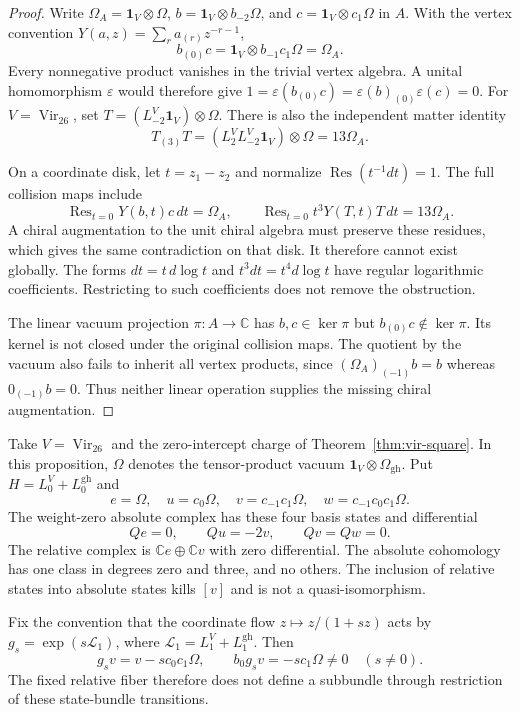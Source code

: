 \begin{proof}
Write $\Omega_A=\mathbf1_V\otimes\Omega$, $b=\mathbf1_V\otimes b_{-2}\Omega$, and $c=\mathbf1_V\otimes c_1\Omega$ in $A$.
With the vertex convention $Y(a,z)=\sum_r a_{(r)}z^{-r-1}$,
\[
 b_{(0)}c=\mathbf1_V\otimes b_{-1}c_1\Omega=\Omega_A.
\]
Every nonnegative product vanishes in the trivial vertex algebra.
A unital homomorphism $\varepsilon$ would therefore give
$1=\varepsilon(b_{(0)}c)=\varepsilon(b)_{(0)}\varepsilon(c)=0$.
For $V=\operatorname{Vir}_{26}$, set $T=(L_{-2}^V\mathbf1_V)\otimes\Omega$.
There is also the independent matter identity
\[
 T_{(3)}T=(L_2^VL_{-2}^V\mathbf1_V)\otimes\Omega=13\Omega_A.
\]

On a coordinate disk, let $t=z_1-z_2$ and normalize
$\operatorname{Res}(t^{-1}dt)=1$.
The full collision maps include
\[
 \operatorname{Res}_{t=0}Y(b,t)c\,dt=\Omega_A,
 \qquad
 \operatorname{Res}_{t=0}t^3Y(T,t)T\,dt=13\Omega_A.
\]
A chiral augmentation to the unit chiral algebra must preserve these residues, which gives the same contradiction on that disk.
It therefore cannot exist globally.
The forms $dt=t\,d\log t$ and $t^3dt=t^4d\log t$ have regular logarithmic coefficients.
Restricting to such coefficients does not remove the obstruction.

The linear vacuum projection $\pi:A\to\mathbb C$ has $b,c\in\ker\pi$ but $b_{(0)}c\notin\ker\pi$.
Its kernel is not closed under the original collision maps.
The quotient by the vacuum also fails to inherit all vertex products, since
$(\Omega_A)_{(-1)}b=b$ whereas $0_{(-1)}b=0$.
Thus neither linear operation supplies the missing chiral augmentation.
\end{proof}

\begin{proposition}
\label{prop:vir-relative-target-obstruction}
Take $V=\operatorname{Vir}_{26}$ and the zero-intercept charge of Theorem~\ref{thm:vir-square}.
In this proposition, $\Omega$ denotes the tensor-product vacuum $\mathbf1_V\otimes\Omega_{\mathrm{gh}}$.
Put $H=L_0^V+L_0^{\mathrm{gh}}$ and
\[
 e=\Omega,\quad u=c_0\Omega,\quad
 v=c_{-1}c_1\Omega,\quad w=c_{-1}c_0c_1\Omega.
\]
The weight-zero absolute complex has these four basis states and differential
\[
 Qe=0,\qquad Qu=-2v,\qquad Qv=Qw=0.
\]
The relative complex is $\mathbb Ce\oplus\mathbb Cv$ with zero differential.
The absolute cohomology has one class in degrees zero and three, and no others.
The inclusion of relative states into absolute states kills $[v]$ and is not a quasi-isomorphism.

Fix the convention that the coordinate flow $z\mapsto z/(1+sz)$ acts by
$g_s=\exp(s\mathcal L_1)$, where $\mathcal L_1=L_1^V+L_1^{\mathrm{gh}}$.
Then
\begin{equation}\label{eq:vir-relative-coordinate-obstruction}
 g_sv=v-sc_0c_1\Omega,
 \qquad b_0g_sv=-sc_1\Omega\neq0\quad(s\neq0).
\end{equation}
The fixed relative fiber therefore does not define a subbundle through restriction of these state-bundle transitions.
\end{proposition}

